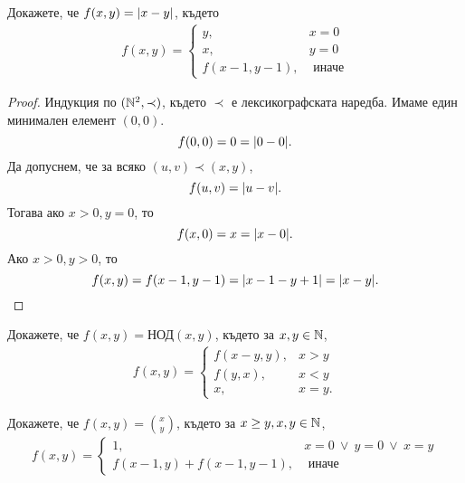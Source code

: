 \begin{problem}
  Докажете,  че $f(x,y) = \lvert{x-y}\rvert$, където
  \begin{align*}
    f(x,y) = 
    \begin{cases}
      y, & x = 0\\
      x, & y = 0\\
      f(x-1,y-1), & \mbox{ иначе}
    \end{cases}
  \end{align*}
\end{problem}
\begin{proof}
  Индукция по $(\mathbb{N}^2,\prec)$, където $\prec$ е лексикографската наредба.
  Имаме един минимален елемент $(0,0)$.
  \[f(0,0) = 0 = \lvert{0 - 0}\rvert.\]
  Да допуснем, че за всяко $(u,v) \prec (x,y)$, 
  \[f(u,v) = \lvert{u - v}\rvert.\]
  Тогава ако $x > 0, y = 0$, то
  \[f(x,0) = x = \lvert{x - 0}\rvert.\]
  Ако $x> 0, y > 0$, то
  \[f(x,y) = f(x-1,y-1) = \lvert{x-1-y+1}\rvert =\lvert{x-y}\rvert.\]
\end{proof}

\begin{problem}
  Докажете, че $f(x,y) = \mbox{НОД}(x,y)$, където
  за $x,y \in \mathbb{N}$,
  \begin{align*}
    f(x,y) = 
    \begin{cases}
      f(x-y,y), & x > y\\
      f(y,x), & x < y\\
      x, & x = y.
    \end{cases}
  \end{align*}
\end{problem}

\begin{problem}
  Докажете, че $f(x,y) = \binom{x}{y}$, където
  за $x \geq y, x,y\in\mathbb{N}$,
  \begin{align*}
    f(x,y) = 
    \begin{cases}
      1, & x = 0\ \vee\ y = 0\ \vee\ x = y\\
      f(x-1,y) + f(x-1,y-1), & \mbox{ иначе}
    \end{cases}
  \end{align*}
\end{problem}



